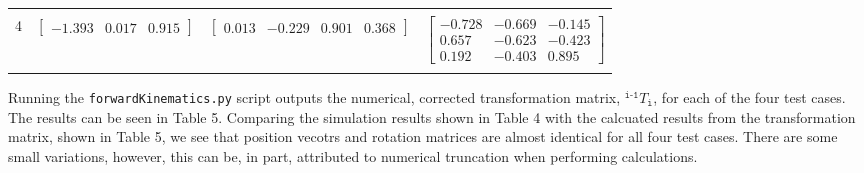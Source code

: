 \documentclass[a4paper]{article}
\begin{document}
\begin{table}[h]
\begin{tabular}{clll}
		 & & & \\
		4 & $\begin{bmatrix}-1.393 & 0.017 & 0.915\end{bmatrix}$ & $\begin{bmatrix}0.013 & -0.229 & 0.901 & 0.368\end{bmatrix}$ & $\begin{bmatrix}-0.728 & -0.669 & -0.145 \\ 0.657 & -0.623 & -0.423 \\ 0.192 & -0.403 & 0.895\end{bmatrix}$\\
		 & & & \\
		\bottomrule
	\end{tabular}
\end{table}

Running the \verb|forwardKinematics.py| script outputs the numerical, corrected transformation matrix, $^{\texttt{i-1}} T_{\texttt{i}}$, for each of the four test cases. The results can be seen in Table 5. Comparing the simulation results shown in Table 4 with the calcuated results from the transformation matrix, shown in Table 5, we see that position vecotrs and rotation matrices are almost identical for all four test cases. There are some small variations, however, this can be, in part, attributed to numerical truncation when performing calculations. 
\end{document}
